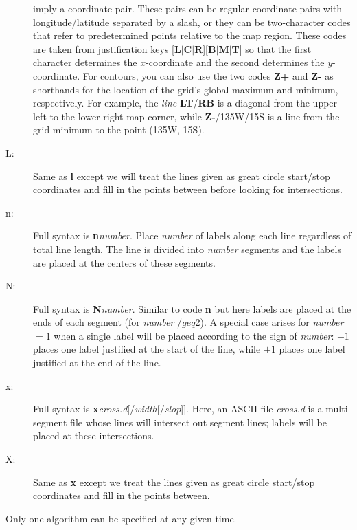 \begin{description}
imply a coordinate pair.  These pairs can be regular coordinate pairs with longitude/latitude separated by a slash, or they
can be two-character codes that refer to predetermined points relative to the map region.  These codes
are taken from  justification keys [{\bf L$|$C$|$R}][{\bf B$|$M$|$T}] so that the first
character determines the $x$-coordinate and the second determines the $y$-coordinate.  For contours,
you can also use the two codes {\bf Z+} and {\bf Z-} as shorthands for the location of the grid's global
maximum and minimum, respectively.  For example, the {\it line} {\bf LT}/{\bf RB} is a diagonal from the
upper left to the lower right map corner, while {\bf Z-}/135W/15S is a line from the grid minimum to the point
(135\DS W, 15\DS S).
\item [L:] Same as {\bf l} except we will treat the lines given as great circle start/stop coordinates and fill in
the points between before looking for intersections.
\item [n:] Full syntax is {\bf n}{\it number}.  Place {\it number} of labels along each line regardless of total
line length.  The line is divided into {\it number} segments and the labels are placed at the centers of these
segments.
\item [N:] Full syntax is {\bf N}{\it number}.  Similar to code {\bf n} but here labels are placed at the ends of
each segment (for {\it number} $ /geq 2$).  A special case arises for {\it number} $= 1$ when a single label will be
placed according to the sign of {\it number}: $-1$ places one label justified at the start of the line, while $+1$ places one label
justified at the end of the line.
\item [x:] Full syntax is {\bf x}{\it cross.d}[/{\it width}[/{\it slop}]].  Here, an ASCII file {\it cross.d} is
a multi-segment file whose lines will intersect out segment lines; labels will be placed at these intersections.
\item [X:] Same as {\bf x} except we treat the lines given as great circle start/stop coordinates and fill in the
points between.
\end{description}
Only one algorithm can be specified at any given time.

